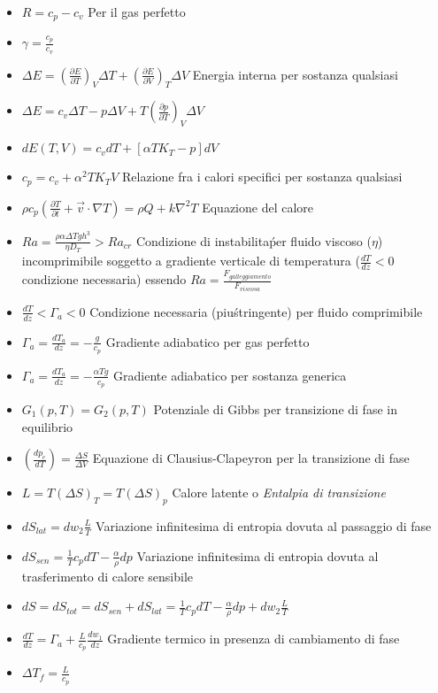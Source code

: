 \documentclass[a4paper]{article}
\begin{document}
\begin{itemize}
	\item $R=c_p-c_v$ Per il gas perfetto
	\item $\gamma=\frac{c_p}{c_v}$
	\item $\Delta E = (\frac{\partial E}{\partial T})_V \Delta T +(\frac{\partial E}{\partial V})_T \Delta V$ Energia interna per sostanza qualsiasi
	\item $\Delta E = c_v \Delta T - p\Delta V+ T(\frac{\partial p}{\partial T})_V \Delta V$
	\item $dE(T,V)=c_vdT+[\alpha T K_T-p]dV$
	\item $c_p=c_v+\alpha^2 T K_T V$ Relazione fra i calori specifici per sostanza qualsiasi
	\item $\rho c_p (\frac{\partial T}{\partial t}+\overrightarrow{v} \cdot \nabla T) = \rho Q + k \nabla^2 T$ Equazione del calore
	\item $Ra=\frac{\rho \alpha \Delta T g h^3}{\eta D_T} > Ra_{cr}$ Condizione di instabilita\' per fluido viscoso ($\eta$) incomprimibile soggetto a gradiente verticale di temperatura ($\frac{dT}{dz}<0$ condizione necessaria) essendo $Ra=\frac{F_{galleggiamento}}{F_{viscosa}}$
	\item $\frac{dT}{dz}<\Gamma_a<0$ Condizione necessaria (piu\' stringente) per fluido comprimibile
	\item $\Gamma_a=\frac{dT_a}{dz}=-\frac{g}{c_p}$ Gradiente adiabatico per gas perfetto
	\item $\Gamma_a = \frac{dT_a}{dz} = -\frac{\alpha T g}{c_p}$ Gradiente adiabatico per sostanza generica
	\item $G_1(p,T)=G_2(p,T)$ Potenziale di Gibbs per transizione di fase in equilibrio
	\item $(\frac{dp_e}{dT})=\frac{\Delta S}{\Delta V}$ Equazione di Clausius-Clapeyron per la transizione di fase
	\item $L=T(\Delta S)_T=T(\Delta S)_p$ Calore latente o \textit{Entalpia di transizione}
	\item $dS_{lat}=dw_2 \frac{L}{T}$ Variazione infinitesima di entropia dovuta al passaggio di fase
	\item $dS_{sen}= \frac{1}{T}c_pdT-\frac{\alpha}{\rho}dp$ Variazione infinitesima di entropia dovuta al trasferimento di calore sensibile
	\item $dS=dS_{tot}=dS_{sen}+dS_{lat} = \frac{1}{T}c_pdT-\frac{\alpha}{\rho}dp + dw_2 \frac{L}{T}$
	\item $\frac{dT}{dz}=\Gamma_a+\frac{L}{c_p} \frac{dw_1}{dz}$ Gradiente termico in presenza di cambiamento di fase
	\item $\Delta T_f = \frac{L}{c_p}$

\end{itemize}
\end{document}
